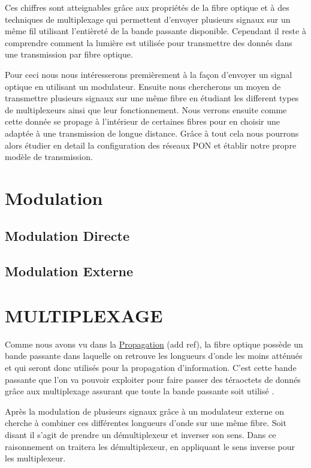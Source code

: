 \documentclass[oneside]{book}
\begin{document}
	Ces chiffres sont atteignables grâce aux propriétés de la fibre optique et à des techniques de multiplexage qui permettent d'envoyer plusieurs signaux sur un même fil utilisant l'entièreté de la bande passante disponible.
	Cependant il reste à comprendre comment la lumière est utilisée pour transmettre des donnés dans une transmission par fibre optique.

	Pour ceci nous nous intéresserons premièrement à la façon d'envoyer un signal optique en utilisant un modulateur. Ensuite nous  chercherons un moyen de transmettre plusieurs signaux sur une même fibre en étudiant les different types de multiplexeurs ainsi que leur fonctionnement. Nous verrons ensuite comme cette donnée se propage à l'intérieur de certaines fibres pour en choisir une adaptée à une transmission de longue distance. Grâce à tout cela nous pourrons alors étudier en detail la configuration des réseaux PON et établir notre propre modèle de transmission. 

	\chapter{Modulation}
		
		\section{Modulation Directe}

		\section{Modulation Externe}



	\chapter{MULTIPLEXAGE}

	\vspace{-40pt}
	
		Comme nous avons vu dans la \underline{Propagation} (add ref), la fibre optique possède un bande passante dans laquelle on retrouve les longueurs d'onde les moins atténués et qui seront donc utilisés pour la propagation d'information. C'est cette bande passante que l'on va pouvoir exploiter pour faire passer des téraoctets de donnés grâce aux multiplexage assurant que toute la bande passante soit utilisé . 

		Après la modulation de plusieurs signaux grâce à un modulateur externe on cherche à combiner ces différentes longueurs d'onde sur une même fibre. Soit disant il s'agit de prendre un démultiplexeur et inverser son sens. Dans ce raisonnement on traitera les démultiplexeur, en appliquant le sens inverse pour les multiplexeur.
\end{document}
